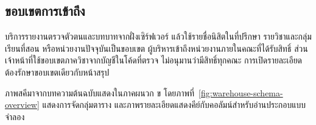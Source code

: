 \subsection{ขอบเขตการเข้าถึง}
บริการรายงานตรวจตัวตนและบทบาทจากฝั่งเซิร์ฟเวอร์ แล้วใช้รายชื่อนิสิตในที่ปรึกษา รายวิชาและกลุ่มเรียนที่สอน หรือหน่วยงานปัจจุบันเป็นขอบเขต ผู้บริหารเข้าถึงหน่วยงานภายในคณะที่ได้รับสิทธิ์ ส่วนเจ้าหน้าที่ใช้ขอบเขตภาควิชาจากบัญชีในโค้ดที่ตรวจ ไม่อนุมานว่ามีสิทธิ์ทุกคณะ การเปิดรายละเอียดต้องรักษาขอบเขตเดียวกับหน้าสรุป\cite{service}

ภาพสคีมาจากบทความต้นฉบับแสดงในภาคผนวก ข โดยภาพที่~\ref{fig:warehouse-schema-overview} แสดงการจัดกลุ่มตาราง และภาพรายละเอียดแสดงคีย์กับคอลัมน์สำหรับอ่านประกอบแบบจำลอง
